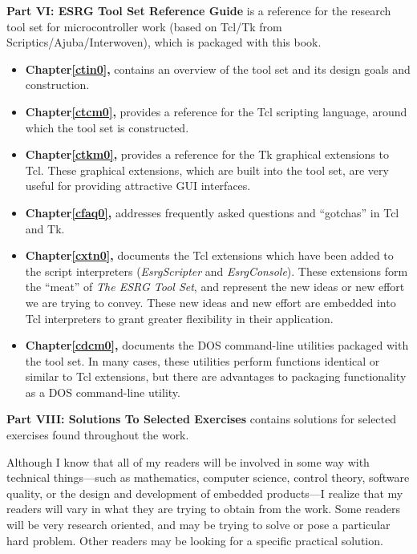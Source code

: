\textbf{Part VI:  ESRG Tool Set Reference Guide}
is a reference for the research tool set for microcontroller 
work (based on Tcl/Tk from Scriptics/Ajuba/Interwoven), which is packaged
with this book.

\begin{itemize}
\item \textbf{Chapter\;\ref{ctin0}, \ctinzerotitle{}} contains an overview
      of the tool set and its design goals and construction.

\item \textbf{Chapter\;\ref{ctcm0}, \ctcmzerotitle{}} provides a reference
      for the Tcl scripting language, around which the tool set is constructed.

\item \textbf{Chapter\;\ref{ctkm0}, \ctkmzerotitle{}} provides a reference
      for the Tk graphical extensions to Tcl.  These graphical extensions,
	  which are built into the tool set, are very useful for providing
	  attractive GUI interfaces.

\item \textbf{Chapter\;\ref{cfaq0}, \cfaqzerotitle{}} addresses frequently
      asked questions and ``gotchas'' in Tcl and Tk.

\item \textbf{Chapter\;\ref{cxtn0}, \cxtnzerotitle{}} documents the Tcl
      extensions which have been added to the script interpreters
	  (\emph{EsrgScripter} and \emph{EsrgConsole}).  These extensions form the
	  ``meat'' of \emph{The ESRG Tool Set}, and represent the new ideas or
	  new effort we are trying to convey.  These new ideas and
      new effort are embedded into  Tcl interpreters to grant
	  greater flexibility in their application.

\item \textbf{Chapter\;\ref{cdcm0}, \cdcmzerotitle{}} documents the DOS command-line
      utilities packaged with the tool set.  In many cases, these utilities
	  perform functions identical or similar to Tcl extensions, but there are advantages to
	  packaging functionality as a DOS command-line utility.
\end{itemize}


\textbf{Part VIII:  Solutions To Selected Exercises}
contains solutions for selected exercises
found throughout the work.

Although I
know that all of my readers will be involved in some way
with technical things---such as mathematics, computer science,
control theory, software quality, or the design and development
of embedded products---I realize that my readers will
vary in what they are trying to obtain from the work.  Some readers
will be very research oriented, and may be trying to solve or pose
a particular hard problem.
Other readers may be looking for a specific practical
solution.

